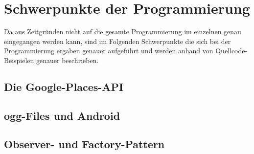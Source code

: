 \section{Schwerpunkte der Programmierung}
Da aus Zeitgr\"unden nicht auf die gesamte Programmierung im einzelnen genau eingegangen werden kann, sind im Folgenden Schwerpunkte die sich bei der Programmierung ergaben genauer aufgef\"uhrt und werden anhand von Quellcode-Beispielen genauer beschrieben.

\subsection{Die Google-Places-API}

\subsection{ogg-Files und Android}
\cite{oggBug} \cite{oogStackOver}

\subsection{Observer- und Factory-Pattern}